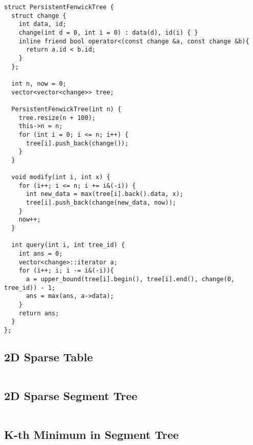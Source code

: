\begin{lstlisting}
struct PersistentFenwickTree {
  struct change {
    int data, id;
    change(int d = 0, int i = 0) : data(d), id(i) { }
    inline friend bool operator<(const change &a, const change &b){
      return a.id < b.id;
    }
  };

  int n, now = 0;
  vector<vector<change>> tree;

  PersistentFenwickTree(int n) {
    tree.resize(n + 100);
    this->n = n;
    for (int i = 0; i <= n; i++) {
      tree[i].push_back(change());
    }
  }
  
  void modify(int i, int x) {
    for (i++; i <= n; i += i&(-i)) {
      int new_data = max(tree[i].back().data, x);
      tree[i].push_back(change(new_data, now));
    }
    now++;
  }

  int query(int i, int tree_id) {
    int ans = 0;
    vector<change>::iterator a;
    for (i++; i; i -= i&(-i)){
      a = upper_bound(tree[i].begin(), tree[i].end(), change(0, tree_id)) - 1;
      ans = max(ans, a->data);
    }
    return ans;
  }
};
\end{lstlisting}

\newpage

\subsection{2D Sparse Table}

\cite{ShahjalalShohag2022Dec}

\hrulefill \vspace{-\baselineskip}
\begin{multicols}{2}
\inputminted[autogobble,fontsize=\tiny]{C++}{Data Structures/2d_sparse_table.cpp}
\end{multicols}
\vspace{-\baselineskip}
\noindent \hrulefill

\subsection{2D Sparse Segment Tree}

\hrulefill \vspace{-\baselineskip}
\begin{multicols}{2}
\inputminted[autogobble,fontsize=\tiny]{C++}{Data Structures/2d_sparse_segment_tree.cpp}
\end{multicols}
\vspace{-\baselineskip}
\noindent \hrulefill

\subsection{K-th Minimum in Segment Tree}

